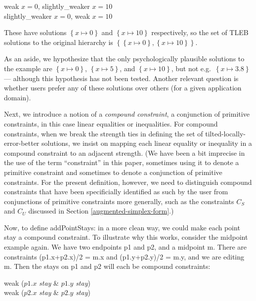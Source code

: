 \documentclass{article}
\newcommand{\strength}{\sf}
\begin{document}
\hspace*{1cm} {\strength weak} $x=0$, {\strength slightly\_weaker} $x=10$ \\
\hspace*{1cm} {\strength slightly\_weaker} $x=0$, {\strength weak} $x=10$

These have solutions $\left\{ x \mapsto 0 \right\}$ and 
$\left\{ x \mapsto 10 \right\}$ respectively, so the set of TLEB 
solutions to the original hierarchy is 
$\left\{ \left\{ x \mapsto 0 \right\} , 
    \left\{ x \mapsto 10 \right\} \right\}$.  

As an aside, we hypothesize that the only psychologically plausible
solutions to the example are $\left\{ x \mapsto 0\right\}$, 
$\left\{ x \mapsto 5\right\} $, and $\left\{ x \mapsto 10\right\}$, 
but not e.g.\ $\left\{ x \mapsto 3.8\right\} $ --- although this hypothesis
has not been tested.  Another relevant question is whether users prefer any
of these solutions over others (for a given application domain).

Next, we introduce a notion of a \emph{compound constraint}, a conjunction
of primitive constraints, in this case linear equalities or inequalities.
For compound constraints, when we break the strength ties in defining the
set of tilted-locally-error-better solutions, we insist on mapping each
linear equality or inequality in a compound constraint to an adjacent
strength.  (We have been a bit imprecise in the use of the term
``constraint'' in this paper, sometimes using it to denote a primitive
constraint and sometimes to denote a conjunction of primitive constraints.
For the present definition, however, we need to distinguish compound
constraints that have been specificially identified as such by the user
from conjunctions of primitive constraints more generally, such as the
constraints $C_S$ and $C_U$ discussed in Section \ref{augmented-simplex-form}.)

Now, to define {\sf addPointStays:} in a more clean way, we could make each
point stay a compound constraint.  To illustrate why this works, consider
the midpoint example again.  We have two endpoints {\sf p1} and {\sf p2},
and a midpoint {\sf m}.  There are constraints {\sf (p1.x+p2.x)/2 = m.x}
and {\sf (p1.y+p2.y)/2 = m.y}, and we are editing {\sf m}.  Then the stays
on {\sf p1} and {\sf p2} will each be compound constraints:

\hspace*{1cm} {\strength weak} ($p1.x$ {\em stay} \& $p1.y$ {\em stay}) \\
\hspace*{1cm} {\strength weak} ($p2.x$ {\em stay} \& $p2.y$ {\em stay})
\end{document}
